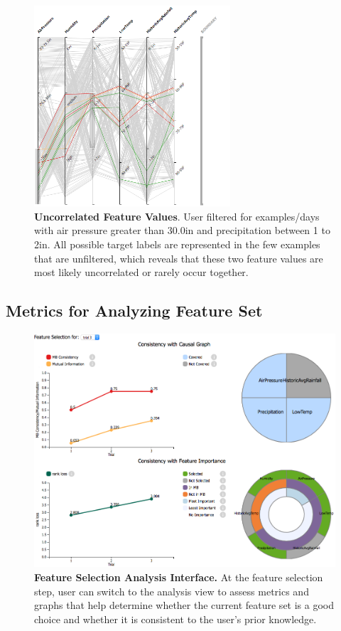 \begin{figure}[!htbp]
\centering
\includegraphics[width=0.65\textwidth]{FilterValuesSparse}
\caption{\textbf{Uncorrelated Feature Values}. User filtered for examples/days with air pressure greater than 30.0in and precipitation between 1 to 2in. All possible target labels are represented in the few examples that are unfiltered, which reveals that these two feature values are most likely uncorrelated or rarely occur together.} \label{fig:FilterValuesSparse}
\end{figure}

\subsection{Metrics for Analyzing Feature Set}
\begin{figure}[!htbp]
\centering
\includegraphics[width=1\textwidth]{FeatureAnalysisInterface}
\caption{\textbf{Feature Selection Analysis Interface.} At the feature selection step, user can switch to the analysis view to assess metrics and graphs that help determine whether the current feature set is a good choice and whether it is consistent to the user's prior knowledge.} \label{fig:FeatureAnalysisInterface}
\end{figure}


